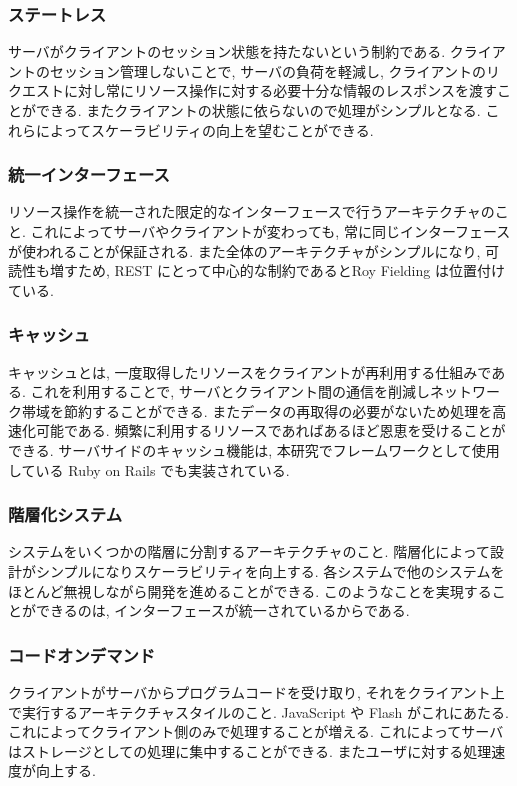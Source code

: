 \documentclass[a4j, 10pt, twocolumn]{ujarticle}
\begin{document}
    \subsubsection{ステートレス}
    サーバがクライアントのセッション状態を持たないという制約である. クライアントのセッション管理しないことで, サーバの負荷を軽減し, クライアントのリクエストに対し常にリソース操作に対する必要十分な情報のレスポンスを渡すことができる. またクライアントの状態に依らないので処理がシンプルとなる. これらによってスケーラビリティの向上を望むことができる.   
    
    \subsubsection{統一インターフェース}
    リソース操作を統一された限定的なインターフェースで行うアーキテクチャのこと. これによってサーバやクライアントが変わっても, 常に同じインターフェースが使われることが保証される. また全体のアーキテクチャがシンプルになり, 可読性も増すため, REST にとって中心的な制約であるとRoy Fielding は位置付けている.
   
    \subsubsection{キャッシュ}
    キャッシュとは, 一度取得したリソースをクライアントが再利用する仕組みである. これを利用することで, サーバとクライアント間の通信を削減しネットワーク帯域を節約することができる.
    またデータの再取得の必要がないため処理を高速化可能である. 頻繁に利用するリソースであればあるほど恩恵を受けることができる. サーバサイドのキャッシュ機能は, 本研究でフレームワークとして使用している Ruby on Rails でも実装されている.

    \subsubsection{階層化システム}
    システムをいくつかの階層に分割するアーキテクチャのこと. 階層化によって設計がシンプルになりスケーラビリティを向上する. 各システムで他のシステムをほとんど無視しながら開発を進めることができる. このようなことを実現することができるのは, インターフェースが統一されているからである.

    \subsubsection{コードオンデマンド}
    クライアントがサーバからプログラムコードを受け取り, それをクライアント上で実行するアーキテクチャスタイルのこと. JavaScript や Flash がこれにあたる. これによってクライアント側のみで処理することが増える. これによってサーバはストレージとしての処理に集中することができる. またユーザに対する処理速度が向上する.
\end{document}
